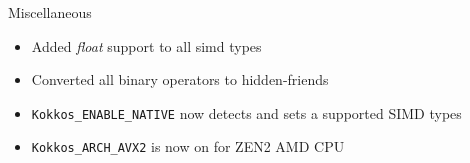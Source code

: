 
\begin{frame}[fragile]{Miscellaneous}

  \begin{itemize}
    \item Added \textit{float} support to all simd types
    \item Converted all binary operators to hidden-friends
    \item \texttt{Kokkos\_ENABLE\_NATIVE} now detects and sets a supported SIMD types
    \item \texttt{Kokkos\_ARCH\_AVX2} is now on for ZEN2 AMD CPU
  \end{itemize}

\end{frame}


